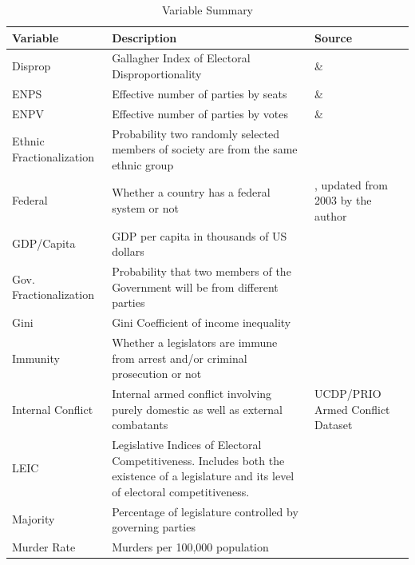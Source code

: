 \documentclass[a4paper]{article}\usepackage[]{graphicx}\usepackage[]{color}
\begin{document}


\begin{table}[!h]
    \begin{center}
    \caption{Variable Summary}
    \label{var_summary}
    \begin{tabular}{l m{7cm} m{3.5cm}}

            \hline
            Variable & Description & Source \\
            \hline \hline
            Disprop & Gallagher Index of Electoral Disproportionality & \cite{Gallagher2012} \& \cite{Carey2011} \\
            ENPS & Effective number of parties by seats & \cite{Gallagher2012} \& \cite{Carey2011} \\
            ENPV & Effective number of parties by votes & \cite{Gallagher2012} \& \cite{Carey2011} \\
            Ethnic Fractionalization & Probability two randomly selected members of society are from the same ethnic group & \cite{Alesina2003} \\
            Federal & Whether a country has a federal system or not & \cite{Carey2011}, updated from 2003 by the author \\
            GDP/Capita & GDP per capita in thousands of US dollars & \cite{WorldBank2011} \\
            Gov. Fractionalization & Probability that two members of the Government will be from different parties & \cite{DPI2001} \\
            Gini & Gini Coefficient of income inequality & \cite{UNU2008} \\
            Immunity & Whether a legislators are immune from arrest and/or criminal prosecution or not & \cite{Fish2009} \\
            Internal Conflict & Internal armed conflict involving purely domestic as well as external combatants & UCDP/PRIO Armed Conflict Dataset \citep{Themner2014} \\
            LEIC & Legislative Indices of Electoral Competitiveness. Includes both the existence of a legislature and its level of electoral competitiveness. & \cite{DPI2001} \\
            Majority & Percentage of legislature controlled by governing parties & \cite{DPI2001} \\
            Murder Rate & Murders per 100,000 population & \cite{UNMurder2013} \\

\end{tabular}
\end{center}
\end{table}
\end{document}
